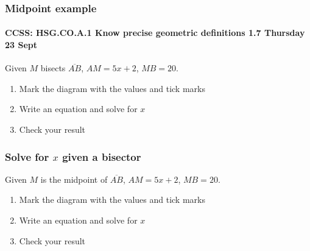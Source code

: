 \frame
{
  \frametitle{Midpoint example}
  \framesubtitle{CCSS: HSG.CO.A.1 Know precise geometric definitions  \hfill \alert{1.7 Thursday 23 Sept}}

  \begin{block}{Given $M$ bisects $\overline{AB}$, $AM=5x+2$, $MB=20$.}
    \begin{enumerate}
      \item Mark the diagram with the values and tick marks
      \item Write an equation and solve for $x$
      \item Check your result
    \end{enumerate} \vspace{1cm}
      \begin{center}
      \end{center}
  \end{block}
}

\frame
{
  \frametitle{Solve for $x$ given a bisector}
  Given $M$ is the midpoint of $\overline{AB}$, $AM=5x+2$, $MB=20$.
  \begin{enumerate}
    \item Mark the diagram with the values and tick marks
    \item Write an equation and solve for $x$
    \item Check your result
  \end{enumerate} \vspace{1cm}
    \begin{center}
    \end{center} \vspace{4cm}
}

